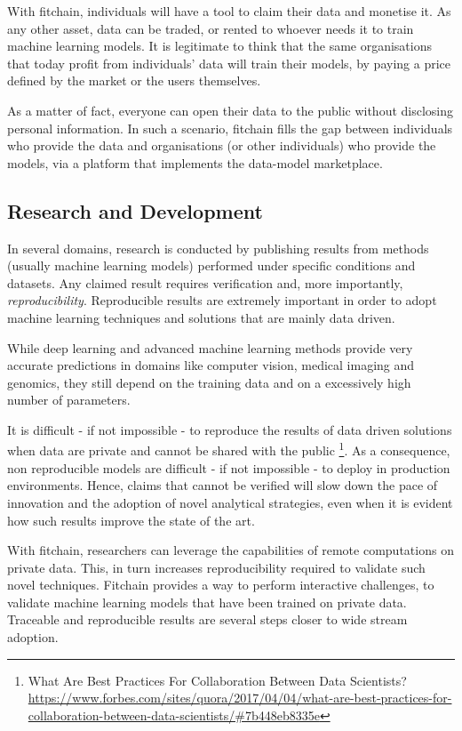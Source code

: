\documentclass[12pt, a4paper,titlepage]{extreport}
\begin{document}
With fitchain, individuals will have a tool to claim their data and monetise it. As any other asset, data can be traded, or rented to whoever needs it to train machine learning models. 
It is legitimate to think that the same organisations that today profit from individuals' data will train their models, by paying a price defined by the market or the users themselves.

As a matter of fact, everyone can open their data to the public without disclosing personal information. 
In such a scenario, fitchain fills the gap between individuals who provide the data and organisations (or other individuals) who provide the models, via a platform that implements the data-model marketplace. 

\subsection{Research and Development}
In several domains, research is conducted by publishing results from methods (usually machine learning models) performed under specific conditions and datasets. Any claimed result requires verification and, more importantly, \textit{reproducibility}. 
Reproducible results are extremely important in order to adopt machine learning techniques and solutions that are mainly data driven. 

While deep learning and advanced machine learning methods provide very accurate predictions in domains like computer vision, medical imaging and genomics, they still depend on the training data and on a excessively high number of parameters. 

It is difficult - if not impossible - to reproduce the results of data driven solutions when data are private and cannot be shared with the public \footnote{What Are Best Practices For Collaboration Between Data Scientists? \url{https://www.forbes.com/sites/quora/2017/04/04/what-are-best-practices-for-collaboration-between-data-scientists/\#7b448eb8335e} }. 
As a consequence, non reproducible models are difficult - if not impossible - to deploy in production environments. Hence, claims that cannot be verified will slow down the pace of innovation and the adoption of novel analytical strategies, even when it is evident how such results improve the state of the art.

With fitchain, researchers can leverage the capabilities of remote computations on private data. This, in turn increases reproducibility required to validate such novel techniques.
Fitchain provides a way to perform interactive challenges, to validate machine learning models that have been trained on private data. Traceable and reproducible results are several steps closer to wide stream adoption. 
\end{document}
